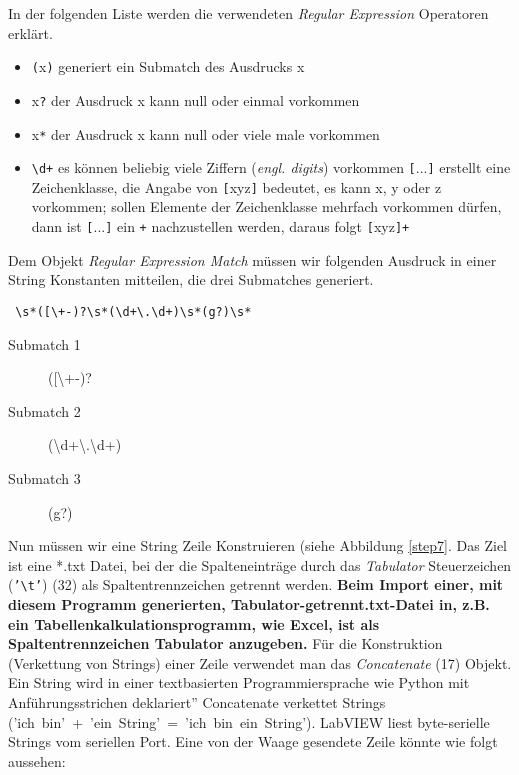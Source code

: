 \documentclass[
fontsize=12pt, 
paper=a4, 
BCOR=10mm, 
twoside=false,
 DIV=10, 
 headsepline, 
 footsepline
 ]{scrartcl}
\begin{document}
 In der folgenden Liste werden die verwendeten \textit{Regular Expression} Operatoren erklärt.

\begin{itemize}
\item \texttt{(}x\texttt{)} generiert ein Submatch des Ausdrucks x
\item x\texttt{?} der Ausdruck x kann null oder einmal vorkommen
\item x\texttt{*} der Ausdruck x kann null oder viele male vorkommen
\item \texttt{\textbackslash d+} es können beliebig viele Ziffern (\textit{engl. digits}) vorkommen
\texttt{[}...\texttt{]} erstellt eine Zeichenklasse, die Angabe von \texttt{[}xyz\texttt{]} bedeutet, es kann x, y oder z vorkommen; sollen Elemente der Zeichenklasse mehrfach vorkommen dürfen, dann ist \texttt{[}...\texttt{]} ein \texttt{+} nachzustellen werden, daraus folgt \texttt{[}xyz\texttt{]+} 
\end{itemize}

Dem Objekt \textit{Regular Expression Match} müssen wir folgenden Ausdruck in einer String Konstanten mitteilen, die drei Submatches generiert.

\begin{center}
\texttt{
\textbackslash s*([\textbackslash +-)?\textbackslash s*(\textbackslash d+\textbackslash .\textbackslash d+)\textbackslash s*(g?)\textbackslash s*
}
\end{center}

\begin{description}
\item[Submatch 1] ([\textbackslash +-)?
\item[Submatch 2] (\textbackslash d+\textbackslash .\textbackslash d+)
\item[Submatch 3] (g?)
\end{description}

Nun müssen wir eine String Zeile Konstruieren (siehe Abbildung \ref{step7}. Das Ziel ist eine *.txt Datei, bei der die Spalteneinträge durch das \textit{Tabulator} Steuerzeichen (\texttt{'\textbackslash t'}) (32) als Spaltentrennzeichen getrennt werden. \textbf{Beim Import einer, mit diesem Programm generierten, Ta\-bu\-lator-getrennt.txt-Datei in, z.B. ein Tabellenkalkulationsprogramm, wie Excel, ist als Spaltentrennzeichen Tabulator anzugeben.} Für die Konstruktion (Verkettung von Strings) einer Zeile verwendet man das \textit{Concatenate} (17) Objekt. Ein String wird in einer textbasierten Programmiersprache wie Python mit  Anführungsstrichen deklariert'' Concatenate verkettet Strings \mbox{(\mbox{'ich bin'} + \mbox{'ein String'} = \mbox{'ich bin ein String'})}. LabVIEW liest byte-serielle Strings vom seriellen Port. Eine von der Waage gesendete Zeile könnte wie folgt aussehen:
\end{document}
